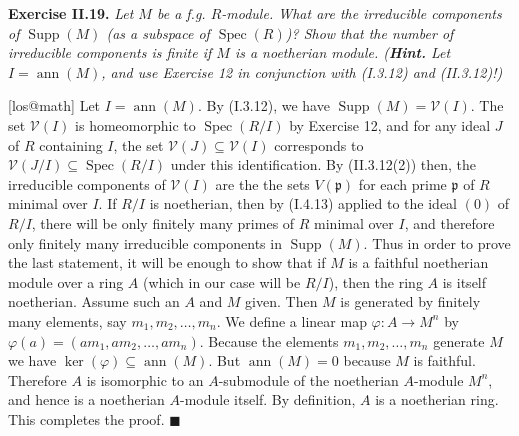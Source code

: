 \documentclass{article}
\makeatletter
\newcommand\<{\triangleleft}
\DeclareMathOperator{\ann}{ann}
\newcommand\p{\mathfrak{p}}
\DeclareMathOperator{\spec}{Spec}
\DeclareMathOperator{\supp}{Supp}
\newcommand{\V}{\mathcal{V}}
\newenvironment{exercise}[1]{\gdef\currentEx{#1}\begin{trivlist}\item[]%
                \textbf{Exercise #1.} \it}{\end{trivlist}}
\newenvironment{solution}[1]{\def\x{#1}\begin{trivlist}\item[]\hspace*{-.5em}[\x]}
                {\hspace*{\fill} $\blacksquare$
                \protected@write0{}{\currentEx, \x}
                \end{trivlist}}
\makeatother
\begin{document}
 \begin{exercise}{II.19}
   Let $M$ be a f.g. $R$-module. What are the irreducible components of $\supp(M)$ (as a
   subspace of $\spec(R)$)? Show that the number of irreducible components is finite if
   $M$ is a noetherian module. ({\bf Hint.} Let $I = \ann(M)$, and use Exercise 12 in
   conjunction with (I.3.12) and (II.3.12)!)
 \end{exercise}
 \begin{solution}{los@math} Let $I= \ann(M)$. By (I.3.12), we have
   $\supp(M) = \V(I)$. The set $\V(I)$ is homeomorphic to $\spec(R/I)$ by Exercise 12,
   and for any ideal $J$ of $R$ containing $I$, the set $\V(J) \subseteq  \V(I)$
   corresponds to $\V(J/I) \subseteq \spec(R/I)$ under this identification.  By
   (II.3.12(2)) then, the irreducible components of $\V(I)$ are the the sets $V(\p)$ for
   each prime $\p$ of $R$ minimal over $I$. If $R/I$ is noetherian, then by (I.4.13)
   applied to the ideal $(0)$ of $R/I$, there will be only finitely many primes of $R$
   minimal over $I$, and therefore only finitely many irreducible components in
   $\supp(M)$. Thus in order to prove the last statement, it will be enough to show that
   if $M$ is a faithful noetherian module over a ring $A$ (which in our case will be
   $R/I$), then the ring $A$ is itself noetherian. Assume such an $A$ and $M$ given. Then
   $M$ is generated by finitely many elements, say $m_1,m_2,\ldots,m_n$. We define a
   linear map $\varphi : A \rightarrow M^n$ by $\varphi(a)=(am_1,am_2,\ldots,am_n)$.
   Because the elements $m_1,m_2,\ldots,m_n$ generate $M$ we have $\ker(\varphi)
   \subseteq \ann(M)$. But $\ann(M) = 0$ because $M$ is faithful. Therefore $A$ is
   isomorphic to an $A$-submodule of the noetherian $A$-module $M^n$, and hence is a
   noetherian $A$-module itself. By definition, $A$ is a noetherian ring. This completes
   the proof.
 \end{solution}
\end{document}
